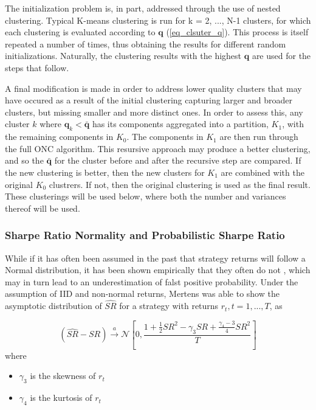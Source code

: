 \documentclass[a4paper,11pt,oneside]{article}
\theoremstyle{plain}
\theoremstyle{definition}
\begin{document}
	The initialization problem is, in part, addressed through the use of nested clustering. Typical K-means clustering is run for k = 2, ..., N-1 clusters, for which each clustering is evaluated according to $\mathbf{q}$ (\ref{eq_clsuter_q}). This process is itself repeated a number of times, thus obtaining the results for different random initializations. Naturally, the clustering results with the highest $\mathbf{q}$ are used for the steps that follow. \newline
	
	A final modification is made in order to address lower quality clusters that may have occured as a result of the initial clustering capturing larger and broader clusters, but missing smaller and more distinct ones. In order to assess this, any cluster $k$ where $\mathbf{q}_k < \mathbf{\bar{q}}$ has its components aggregated into a partition, $K_1$, with the remaining components in $K_0$. The components in $K_1$ are then run through the full ONC algorithm. This resursive approach may produce a better clustering, and so the  $\mathbf{\bar{q}}$  for the cluster before and after the recursive step are compared. If the new clustering is better, then the new clusters for $K_1$ are combined with the original $K_0$ clustrers. If not, then the original clustering is used as the final result. These clusterings will be used below, where both the number and variances thereof will be used.
	
	\subsubsection{Sharpe Ratio Normality and Probabilistic Sharpe Ratio}\label{sr_normality}
	
	While if it has often been assumed in the past that strategy returns will follow a Normal distribution, it has been shown empirically that they often do not \cite{Brooks and Kat2002; Ingersoll 2007}, which may in turn lead to an underestimation of falst positive probability. Under the assumption of IID and non-normal returns, Mertens \cite{Mertens} was able to show the asymptotic distribution of $\widehat{SR}$ for a strategy with returns $r_t , t = 1, ..., T$,  as 
	
	\begin{equation}
	(\widehat{S R}-S R) \stackrel{a}{\rightarrow} \mathcal{N}\left[0, \frac{1+\frac{1}{2} S R^{2}-\gamma_{3} S R+\frac{\gamma_{4}-3}{4} S R^{2}}{T}\right]
	\end{equation}
	where
	\begin{itemize}
		\item [] $\gamma_3$ is the skewness of $r_t$
		\item [] $\gamma_4$ is the kurtosis of $r_t$
	\end{itemize}
\end{document}
